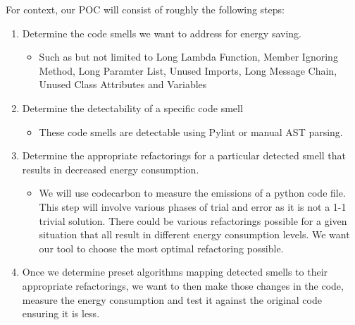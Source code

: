 \documentclass{article}
\begin{document}
For context, our POC will consist of roughly the following steps:
\begin{enumerate}
  \item Determine the code smells we want to address for energy saving.
  \begin{itemize}
    \item Such as but not limited to Long Lambda Function, Member Ignoring Method, Long Paramter List, Unused Imports, Long Message Chain, Unused Class Attributes and Variables
  \end{itemize} 
  \item Determine the detectability of a specific code smell 
  \begin{itemize}
    \item These code smells are detectable using Pylint or manual AST parsing.
  \end{itemize} 
  \item Determine the appropriate refactorings for a particular detected smell that results in decreased energy consumption.
  \begin{itemize}
    \item We will use codecarbon to measure the emissions of a python code file. This step will involve various phases of trial and error as it is not a 1-1 trivial solution. There could be various refactorings possible for a given situation that all result in different energy consumption levels. We want our tool to choose the most optimal refactoring possible.
  \end{itemize} 
  \item Once we determine preset algorithms mapping detected smells to their appropriate refactorings, we want to then make those changes in the code, measure the energy consumption and test it against the original code ensuring it is less.
\end{enumerate}
\end{document}
